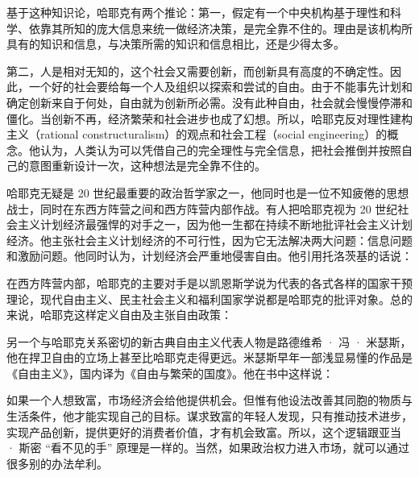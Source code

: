 基于这种知识论，哈耶克有两个推论：第一，假定有一个中央机构基于理性和科学、依靠其所知的庞大信息来统一做经济决策，是完全靠不住的。理由是该机构所具有的知识和信息，与决策所需的知识和信息相比，还是少得太多。

第二，人是相对无知的，这个社会又需要创新，而创新具有高度的不确定性。因此，一个好的社会要给每一个人及组织以探索和尝试的自由。由于不能事先计划和确定创新来自于何处，自由就为创新所必需。没有此种自由，社会就会慢慢停滞和僵化。当创新不再，经济繁荣和社会进步也成了幻想。所以，哈耶克反对理性建构主义（rational constructuralism）的观点和社会工程（social engineering）的概念。他认为，人类认为可以凭借自己的完全理性与完全信息，把社会推倒并按照自己的意图重新设计一次，这种想法是完全靠不住的。

哈耶克无疑是 20 世纪最重要的政治哲学家之一，他同时也是一位不知疲倦的思想战士，同时在东西方阵营之间和西方阵营内部作战。有人把哈耶克视为 20 世纪社会主义计划经济最强悍的对手之一，因为他一生都在持续不断地批评社会主义计划经济。他主张社会主义计划经济的不可行性，因为它无法解决两大问题：信息问题和激励问题。他同时认为，计划经济会严重地侵害自由。他引用托洛茨基的话说：


在西方阵营内部，哈耶克的主要对手是以凯恩斯学说为代表的各式各样的国家干预理论，现代自由主义、民主社会主义和福利国家学说都是哈耶克的批评对象。总的来说，哈耶克这样定义自由及主张自由政策：


另一个与哈耶克关系密切的新古典自由主义代表人物是路德维希 · 冯 · 米瑟斯，他在捍卫自由的立场上甚至比哈耶克走得更远。米瑟斯早年一部浅显易懂的作品是《自由主义》，国内译为《自由与繁荣的国度》。他在书中这样说：


如果一个人想致富，市场经济会给他提供机会。但惟有他设法改善其同胞的物质与生活条件，他才能实现自己的目标。谋求致富的年轻人发现，只有推动技术进步，实现产品创新，提供更好的消费者价值，才有机会致富。所以，这个逻辑跟亚当 · 斯密 “看不见的手” 原理是一样的。当然，如果政治权力进入市场，就可以通过很多别的办法牟利。

